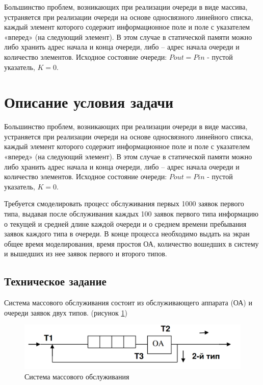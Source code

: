 Большинство  проблем, 
возникающих при реализации очереди в виде массива, устраняется при реализации 
очереди  на  основе  односвязного  линейного списка,  каждый  элемент  которого 
содержит  информационное  поле  и  поле  с  указателем  «вперед»  (на  следующий 
элемент).  В этом случае в статической памяти можно либо хранить адрес начала и 
конца  очереди,  либо  –  адрес  начала  очереди  и  количество  элементов.  Исходное 
состояние очереди: $Pout = Pin$  - пустой указатель, $K = 0$. 

\section{Описание условия задачи}

Большинство  проблем, 
возникающих при реализации очереди в виде массива, устраняется при реализации 
очереди  на  основе  односвязного  линейного списка,  каждый  элемент  которого 
содержит  информационное  поле  и  поле  с  указателем  «вперед»  (на  следующий 
элемент).  В этом случае в статической памяти можно либо хранить адрес начала и 
конца  очереди,  либо  –  адрес  начала  очереди  и  количество  элементов.  Исходное 
состояние очереди: $Pout = Pin$  - пустой указатель, $K = 0$.

Требуется смоделировать процесс обслуживания первых 1000 заявок первого 
типа, выдавая после обслуживания каждых 100 заявок первого типа информацию о 
текущей и средней длине каждой очереди и о среднем времени пребывания заявок 
каждого типа в очереди. В конце процесса необходимо выдать на экран общее время 
моделирования, время простоя ОА, количество вошедших в систему и вышедших из 
нее заявок первого и второго типов.

\subsection{Техническое задание}

Система  массового  обслуживания  состоит  из  обслуживающего  аппарата 
(ОА) и очереди заявок двух типов. (рисунок \ref{fig:oa})

\begin{figure}
	\centering
	\includegraphics[width=0.7\linewidth]{img/OA}
	\caption{Система массового обслуживания}
	\label{fig:oa}
\end{figure}

